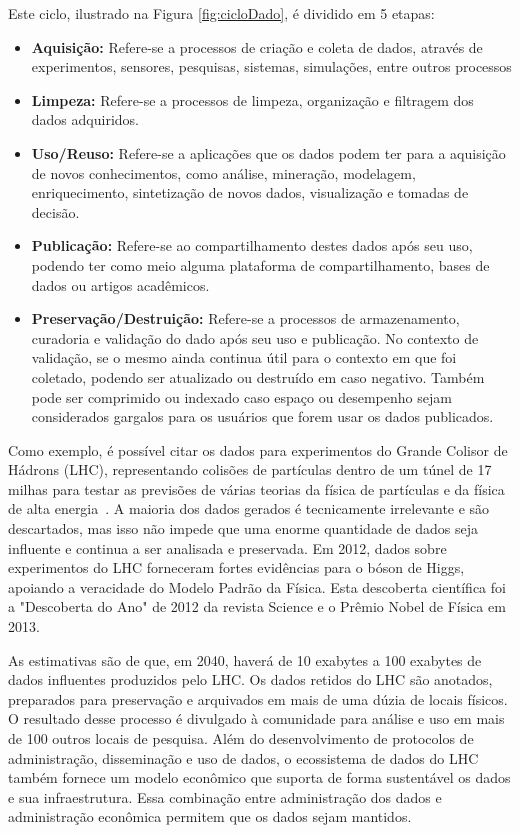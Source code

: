 \documentclass[portugues]{ic-tese}
\begin{document}
Este ciclo, ilustrado na Figura \ref{fig:cicloDado}, é dividido em 5 etapas:

\begin{itemize}
\item \textbf{Aquisição:} Refere-se a processos de criação e coleta de dados, através de experimentos, sensores, pesquisas, sistemas, simulações, entre outros processos
\item \textbf{Limpeza:} Refere-se a processos de limpeza, organização e filtragem dos dados adquiridos.
\item \textbf{Uso/Reuso:} Refere-se a aplicações que os dados podem ter para a aquisição de novos conhecimentos, como análise, mineração, modelagem, enriquecimento, sintetização de novos dados, visualização e tomadas de decisão.
\item \textbf{Publicação:} Refere-se ao compartilhamento destes dados após seu uso, podendo ter como meio alguma plataforma de compartilhamento, bases de dados ou artigos acadêmicos.
\item \textbf{Preservação/Destruição:} Refere-se a processos de armazenamento, curadoria e validação do dado após seu uso e publicação. No contexto de validação, se o mesmo ainda continua útil para o contexto em que foi coletado, podendo ser atualizado ou destruído em caso negativo. Também pode ser comprimido ou indexado caso espaço ou desempenho sejam considerados gargalos para os usuários que forem usar os dados publicados.
\end{itemize}

Como exemplo, é possível citar os dados para experimentos do Grande Colisor de Hádrons (LHC), representando colisões de partículas dentro de um túnel de 17 milhas para testar as previsões de várias teorias da física de partículas e da física de alta energia~\citep{Berman_2018}. A maioria dos dados gerados é tecnicamente irrelevante e são descartados, mas isso não impede que uma enorme quantidade de dados seja influente e continua a ser analisada e preservada. Em 2012, dados sobre experimentos do LHC forneceram fortes evidências para o bóson de Higgs, apoiando a veracidade do Modelo Padrão da Física. Esta descoberta científica foi a "Descoberta do Ano" de 2012 da revista Science e o Prêmio Nobel de Física em 2013.

As estimativas são de que, em 2040, haverá de 10 exabytes a 100 exabytes de dados influentes produzidos pelo LHC. Os dados retidos do LHC são anotados, preparados para preservação e arquivados em mais de uma dúzia de locais físicos. O resultado desse processo é divulgado à comunidade para análise e uso em mais de 100 outros locais de pesquisa. Além do desenvolvimento de protocolos de administração, disseminação e uso de dados, o ecossistema de dados do LHC também fornece um modelo econômico que suporta de forma sustentável os dados e sua infraestrutura. Essa combinação entre administração dos dados e administração econômica permitem que os dados sejam mantidos.
\end{document}
